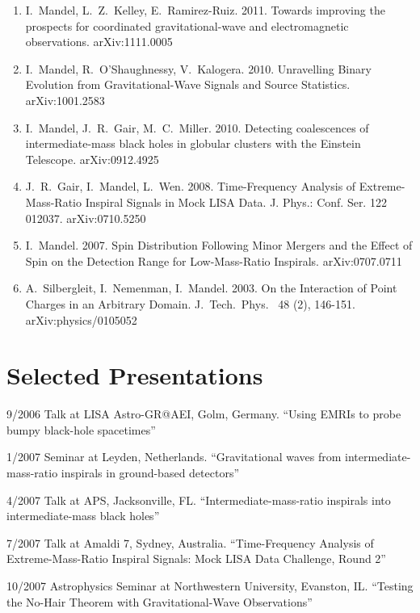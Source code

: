 \documentclass[margin,line]{res}
\begin{document}
\begin{resume}
\begin{enumerate}
\item I.~Mandel, L.~Z.~Kelley, E.~Ramirez-Ruiz. 2011. Towards improving the prospects for coordinated gravitational-wave and electromagnetic observations. arXiv:1111.0005
 
\item I.~Mandel, R.~O'Shaughnessy, V.~Kalogera.  2010.  Unravelling Binary Evolution from Gravitational-Wave Signals and Source Statistics. arXiv:1001.2583 

\item I.~Mandel, J.~R.~Gair, M.~C.~Miller.  2010.  Detecting coalescences of intermediate-mass black holes in globular clusters with the Einstein Telescope.  arXiv:0912.4925  

\item J.~R.~Gair, I.~Mandel, L.~Wen. 2008.  Time-Frequency Analysis of 
Extreme-Mass-Ratio Inspiral Signals in Mock LISA Data.  
J. Phys.: Conf. Ser. 122 012037.  arXiv:0710.5250

\item I.~Mandel. 2007. Spin Distribution Following Minor Mergers and the 
Effect of Spin on the Detection Range for Low-Mass-Ratio Inspirals. 
arXiv:0707.0711

\item A.~Silbergleit, I.~Nemenman, I.~Mandel. 2003. On the Interaction of 
Point Charges in an Arbitrary Domain.  J.~Tech.~Phys.~ 48 (2), 146-151.  
arXiv:physics/0105052

\end{enumerate}

\newpage
\section{\sc Selected Presentations}
9/2006 	 Talk  at LISA Astro-GR@AEI, Golm, Germany. 	 ``Using EMRIs to probe bumpy black-hole spacetimes''

1/2007 	Seminar at Leyden, Netherlands. 	``Gravitational waves from intermediate-mass-ratio inspirals in ground-based detectors''

4/2007 	Talk 	at APS, Jacksonville, FL. 	``Intermediate-mass-ratio inspirals into intermediate-mass black holes''

7/2007 	Talk 	at Amaldi 7, Sydney, Australia. 	``Time-Frequency Analysis of Extreme-Mass-Ratio Inspiral Signals: Mock LISA Data Challenge, Round 2''

10/2007 	Astrophysics Seminar at Northwestern University, Evanston, IL. 	``Testing the No-Hair Theorem with Gravitational-Wave Observations''


\end{resume}
\end{document}
